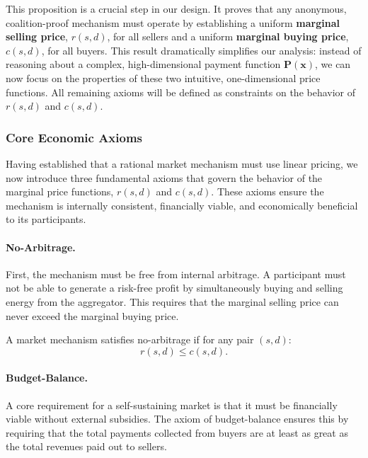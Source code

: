 \documentclass[12pt, notitlepage]{article}
\begin{document}
This proposition is a crucial step in our design. It proves that any anonymous, coalition-proof mechanism must operate by establishing a uniform \textbf{marginal selling price}, $r(s,d)$, for all sellers and a uniform \textbf{marginal buying price}, $c(s,d)$, for all buyers. This result dramatically simplifies our analysis: instead of reasoning about a complex, high-dimensional payment function $\bm{P}(\bm{x})$, we can now focus on the properties of these two intuitive, one-dimensional price functions. All remaining axioms will be defined as constraints on the behavior of $r(s,d)$ and $c(s,d)$.


\subsubsection{Core Economic Axioms}

Having established that a rational market mechanism must use linear pricing, we now introduce three fundamental axioms that govern the behavior of the marginal price functions, $r(s,d)$ and $c(s,d)$. These axioms ensure the mechanism is internally consistent, financially viable, and economically beneficial to its participants.

\paragraph{No-Arbitrage.}
First, the mechanism must be free from internal arbitrage. A participant must not be able to generate a risk-free profit by simultaneously buying and selling energy from the aggregator. This requires that the marginal selling price can never exceed the marginal buying price.

\begin{axiom}[No-Arbitrage] \label{no-arb}
A market mechanism satisfies no-arbitrage if for any pair $(s,d)$:
\begin{equation}
    r(s,d) \le c(s,d).
\end{equation}
\end{axiom}

\paragraph{Budget-Balance.}
A core requirement for a self-sustaining market is that it must be financially viable without external subsidies. The axiom of budget-balance ensures this by requiring that the total payments collected from buyers are at least as great as the total revenues paid out to sellers.
\end{document}
